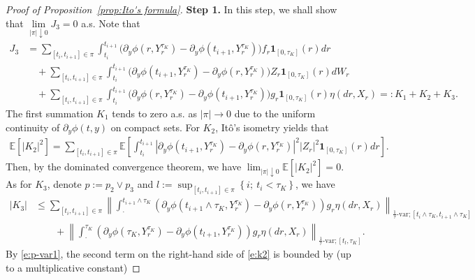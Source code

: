 \documentclass[10pt,a4paper]{amsart}
\def\E{\mathbb E}
\begin{document}
\begin{proof}[Proof of Proposition~\ref{prop:Ito's formula}]
\textbf{Step 1.}
In this step, we shall show that $\lim\limits_{|\pi|\downarrow 0}J_{3} = 0$ a.s.  Note that
\begin{equation*}	\begin{aligned}
J_{3} &= \sum_{[t_{i},t_{i+1}]\in \pi} \int_{t_{i}}^{t_{i+1}}\big(\partial_{y}\phi(r,Y^{\tau_{K}}_{r}) - \partial_{y}\phi(t_{i+1},Y^{\tau_{K}}_{r})\big) f_r \mathbf{1}_{[0,\tau_{K}]}(r)dr\\
&\quad + \sum_{[t_{i},t_{i+1}]\in \pi} \int_{t_{i}}^{t_{i+1}}\big(\partial_{y}\phi(t_{i+1},Y^{\tau_{K}}_{r}) - \partial_{y}\phi(r,Y^{\tau_{K}}_{r})\big) Z_r \mathbf{1}_{[0,\tau_{K}]}(r)dW_{r}\\
&\quad +\sum_{[t_{i},t_{i+1}]\in \pi}
\int_{t_{i}}^{t_{i+1}}\big(\partial_{y}\phi(r,Y^{\tau_{K}}_{r}) - \partial_{y}\phi(t_{i+1},Y^{\tau_{K}}_{r})\big) g_r \mathbf{1}_{[0,\tau_{K}]}(r) \eta(dr,X_{r}) =: K_1 + K_2 +K_3.
\end{aligned}
\end{equation*}
The first summation $K_1$ tends to zero a.s. as $|\pi|\to 0$ due to the uniform continuity of $\partial_y \phi(t, y)$ on compact sets. For $K_{2}$, It\^o's isometry yields that
\begin{equation*}		\begin{aligned}	\mathbb{E}\left[|K_{2}|^{2}\right] = \sum_{[t_{i},t_{i+1}]\in\pi} \E\left[\int_{t_{i}}^{t_{i+1}} |\partial_{y}\phi(t_{i+1},Y^{\tau_{K}}_{r})-\partial_{y}\phi(r,Y^{\tau_{K}}_{r})|^{2}|Z_{r}|^{2}\mathbf{1}_{[0,\tau_{K}]}(r) dr\right].
\end{aligned}
\end{equation*}
Then, by the dominated convergence theorem, we have
$\lim_{|\pi|\downarrow 0}\mathbb{E}\left[|K_{2}|^{2}\right] = 0.$			
As for $K_{3}$, denote $p := p_{2}\vee p_{3}$ and  $l := \sup_{[t_{i},t_{i+1}]\in \pi}\left\{i;\ t_{i} < \tau_{K}\right\}$, we have
\begin{align}\label{e:k2}\nonumber
|K_{3}|
&\le \sum_{[t_{i},t_{i+1}]\in \pi} \left\|\int_{\cdot}^{t_{i+1}\land \tau_{K}}(\partial_{y}\phi(t_{i+1}\land \tau_{K},Y^{\tau_{K}}_{r}) - \partial_{y}\phi(r,Y^{\tau_{K}}_{r}))g_{r}\eta(dr,X_{r})\right\|_{\frac{1}{\tau}\text{-var};[t_{i}\land \tau_{K},t_{i+1}\land \tau_{K}]}\\  
&\qquad + \left\|\int_{\cdot}^{\tau_{K}}(\partial_{y}\phi( \tau_{K},Y^{\tau_{K}}_{r}) - \partial_{y}\phi(t_{l+1},Y^{\tau_{K}}_{r}))g_{r}\eta(dr,X_{r})\right\|_{\frac{1}{\tau}\text{-var};[t_{l},\tau_{K}]}.
\end{align}
By \eqref{e:p-var1}, the second term on the right-hand side of \eqref{e:k2} is bounded by  (up to a multiplicative constant)

\end{proof}
\end{document}
